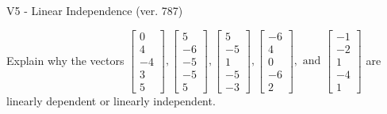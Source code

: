 \begin{exercise}
  \begin{exerciseTitle}V5 - Linear Independence (ver. 787)\end{exerciseTitle}
  \begin{exerciseStatement}
    Explain why the vectors \(\left[\begin{array}{r}
0 \\
4 \\
-4 \\
3 \\
5
\end{array}\right] , \left[\begin{array}{r}
5 \\
-6 \\
-5 \\
-5 \\
5
\end{array}\right] , \left[\begin{array}{r}
5 \\
-5 \\
1 \\
-5 \\
-3
\end{array}\right] , \left[\begin{array}{r}
-6 \\
4 \\
0 \\
-6 \\
2
\end{array}\right] , \text{ and } \left[\begin{array}{r}
-1 \\
-2 \\
1 \\
-4 \\
1
\end{array}\right]\) are linearly dependent or linearly independent.	



\end{exerciseStatement}
\end{exercise}
